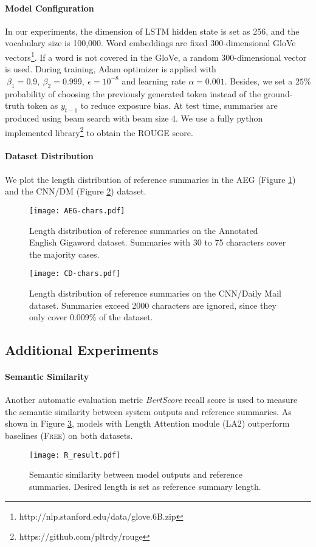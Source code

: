 \documentclass[11pt,a4paper]{article}
\begin{document}
\paragraph{Model Configuration}
In our experiments, the dimension of LSTM hidden state is set as 256, and the vocabulary size is 100,000. Word embeddings are fixed 300-dimensional GloVe vectors\footnote{http://nlp.stanford.edu/data/glove.6B.zip}. If a word is not covered in the GloVe, a random 300-dimensional vector is used. During training, Adam optimizer is applied with $\ \beta_1=0.9, \ \beta_2 = 0.999, \ \epsilon = 10^{-8}$ and learning rate $\alpha = 0.001$. Besides, we set a $25\%$ probability of choosing the previously generated token instead of the ground-truth token as $y_{t-1}$ to reduce exposure bias. At test time, summaries are produced using beam search with beam size 4. We use a fully python implemented library\footnote{https://github.com/pltrdy/rouge} to obtain the ROUGE score.

\paragraph{Dataset Distribution}
We plot the length distribution of reference summaries in the AEG (Figure \ref{fig:aeg-distribution}) and the CNN/DM (Figure \ref{fig:cd-distribution}) dataset.

\begin{figure}[!htp]
\centering
\texttt{[image: AEG-chars.pdf]}
\caption{Length distribution of reference summaries on the Annotated English Gigaword dataset. Summaries with 30 to 75 characters cover the majority cases.}
\label{fig:aeg-distribution}
\end{figure}

\begin{figure}[!htp]
\centering
\texttt{[image: CD-chars.pdf]}
\caption{Length distribution of reference summaries on the CNN/Daily Mail dataset. Summaries exceed 2000 characters are ignored, since they only cover 0.009\% of the dataset.}
\label{fig:cd-distribution}
\end{figure}

\subsection{Additional Experiments}
\paragraph{Semantic Similarity}
Another automatic evaluation metric \textit{BertScore} \cite{bert-score} recall score is used to measure the semantic similarity between system outputs and reference summaries. As shown in Figure \ref{fig:sim_result}, models with Length Attention module (\textsc{LA2}) outperform baselines (\textsc{Free}) on both datasets. 
\begin{figure}[!htb]
  \centering
  \texttt{[image: R\_result.pdf]}
  \caption{Semantic similarity between model outputs and reference summaries. Desired length is set as reference summary length.}
  \label{fig:sim_result}
\end{figure}
\end{document}
